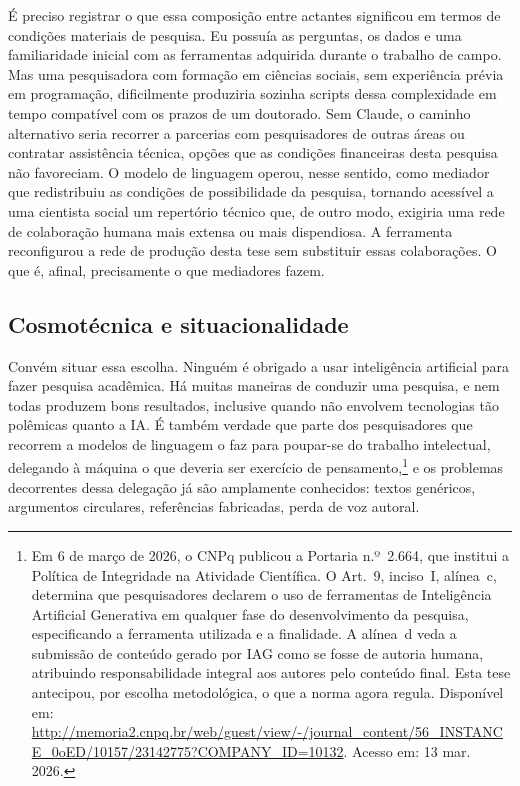 É preciso registrar o que essa composição entre actantes significou em termos de condições materiais de pesquisa. Eu possuía as perguntas, os dados e uma familiaridade inicial com as ferramentas adquirida durante o trabalho de campo. Mas uma pesquisadora com formação em ciências sociais, sem experiência prévia em programação, dificilmente produziria sozinha scripts dessa complexidade em tempo compatível com os prazos de um doutorado. Sem Claude, o caminho alternativo seria recorrer a parcerias com pesquisadores de outras áreas ou contratar assistência técnica, opções que as condições financeiras desta pesquisa não favoreciam. O modelo de linguagem operou, nesse sentido, como mediador que redistribuiu as condições de possibilidade da pesquisa, tornando acessível a uma cientista social um repertório técnico que, de outro modo, exigiria uma rede de colaboração humana mais extensa ou mais dispendiosa. A ferramenta reconfigurou a rede de produção desta tese sem substituir essas colaborações. O que é, afinal, precisamente o que mediadores fazem.


\subsection*{Cosmotécnica e situacionalidade}

Convém situar essa escolha. Ninguém é obrigado a usar inteligência artificial para fazer pesquisa acadêmica. Há muitas maneiras de conduzir uma pesquisa, e nem todas produzem bons resultados, inclusive quando não envolvem tecnologias tão polêmicas quanto a IA. É também verdade que parte dos pesquisadores que recorrem a modelos de linguagem o faz para poupar-se do trabalho intelectual, delegando à máquina o que deveria ser exercício de pensamento,\footnote{Em 6 de março de 2026, o CNPq publicou a Portaria n.º~2.664, que institui a Política de Integridade na Atividade Científica. O Art.~9, inciso~I, alínea~c, determina que pesquisadores declarem o uso de ferramentas de Inteligência Artificial Generativa em qualquer fase do desenvolvimento da pesquisa, especificando a ferramenta utilizada e a finalidade. A alínea~d veda a submissão de conteúdo gerado por IAG como se fosse de autoria humana, atribuindo responsabilidade integral aos autores pelo conteúdo final. Esta tese antecipou, por escolha metodológica, o que a norma agora regula. Disponível em: \url{http://memoria2.cnpq.br/web/guest/view/-/journal_content/56_INSTANCE_0oED/10157/23142775?COMPANY_ID=10132}. Acesso em: 13 mar. 2026.} e os problemas decorrentes dessa delegação já são amplamente conhecidos: textos genéricos, argumentos circulares, referências fabricadas, perda de voz autoral.

